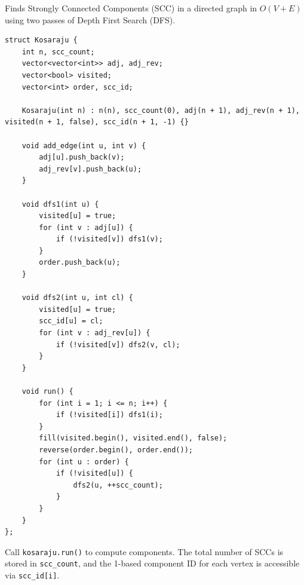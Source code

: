 
Finds Strongly Connected Components (SCC) in a directed graph in $O(V + E)$ using two passes of Depth First Search (DFS).
\begin{lstlisting}
struct Kosaraju {
    int n, scc_count;
    vector<vector<int>> adj, adj_rev;
    vector<bool> visited;
    vector<int> order, scc_id;

    Kosaraju(int n) : n(n), scc_count(0), adj(n + 1), adj_rev(n + 1), visited(n + 1, false), scc_id(n + 1, -1) {}

    void add_edge(int u, int v) {
        adj[u].push_back(v);
        adj_rev[v].push_back(u);
    }

    void dfs1(int u) {
        visited[u] = true;
        for (int v : adj[u]) {
            if (!visited[v]) dfs1(v);
        }
        order.push_back(u);
    }

    void dfs2(int u, int cl) {
        visited[u] = true;
        scc_id[u] = cl;
        for (int v : adj_rev[u]) {
            if (!visited[v]) dfs2(v, cl);
        }
    }

    void run() {
        for (int i = 1; i <= n; i++) {
            if (!visited[i]) dfs1(i);
        }
        fill(visited.begin(), visited.end(), false);
        reverse(order.begin(), order.end());
        for (int u : order) {
            if (!visited[u]) {
                dfs2(u, ++scc_count);
            }
        }
    }
};
\end{lstlisting}

Call \lstinline|kosaraju.run()| to compute components. The total number of SCCs is stored in \lstinline|scc_count|, and the 1-based component ID for each vertex is accessible via \lstinline|scc_id[i]|.
